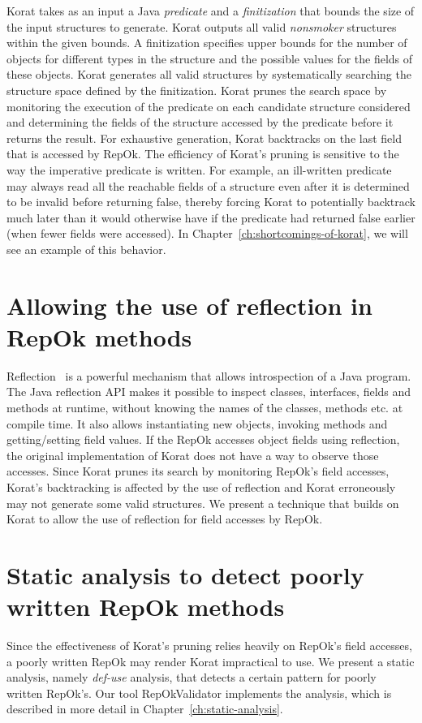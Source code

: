 \para Korat takes as an input a Java \emph{predicate} and a
\emph{finitization} that bounds the size of the input structures to
generate.  Korat outputs all valid \emph{nonsmoker} structures
within the given bounds. A finitization specifies upper bounds for the
number of objects for different types in the structure and the
possible values for the fields of these objects. Korat generates all
valid structures by systematically searching the structure space
defined by the finitization. Korat prunes the search space by
monitoring the execution of the predicate on each candidate structure
considered and determining the fields of the structure accessed by the
predicate before it returns the result. For exhaustive generation,
Korat backtracks on the last field that is accessed by RepOk.  The
efficiency of Korat's pruning is sensitive to the way the imperative
predicate is written. For example, an ill-written predicate may always
read all the reachable fields of a structure even after it is
determined to be invalid before returning false, thereby forcing Korat
to potentially backtrack much later than it would otherwise have if
the predicate had returned false earlier (when fewer fields were
accessed).  In Chapter~\ref{ch:shortcomings-of-korat}, we will see an
example of this behavior.

\section{Allowing the use of reflection in RepOk methods}
\label{sec:allowing-reflection-repok}
Reflection~\cite{maes1987concepts,bracha2004mirrors,mostinckx2009mirror} is a powerful mechanism that allows
introspection of a Java program.  The Java reflection API makes it
possible to inspect classes, interfaces, fields and methods at
runtime, without knowing the names of the classes, methods etc. at
compile time. It also allows instantiating new objects, invoking
methods and getting/setting field values.  If the RepOk accesses
object fields using reflection, the original implementation of Korat
does not have a way to observe those accesses.  Since Korat prunes its
search by monitoring RepOk's field accesses, Korat's backtracking is
affected by the use of reflection and Korat erroneously may not
generate some valid structures.  We present a technique that builds on
Korat to allow the use of reflection for field accesses by RepOk.

\section{Static analysis to detect poorly written RepOk methods}
\label{sec:static-analysis-poorly-written-repok}
Since the effectiveness of Korat's pruning relies heavily on RepOk's
field accesses, a poorly written RepOk may render Korat impractical to
use.  We present a static analysis, namely \emph{def-use} analysis,
that detects a certain pattern for poorly written RepOk's.  Our tool
RepOkValidator implements the analysis, which is described in more
detail in Chapter~\ref{ch:static-analysis}.

